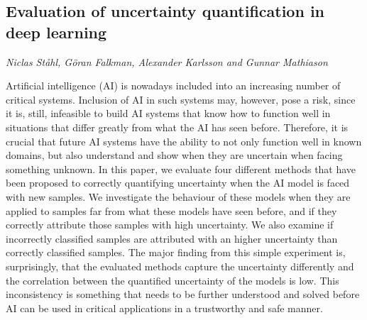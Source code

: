 \documentclass[../booklet.tex]{subfiles}
\begin{document}
\subsection[Evaluation of uncertainty quantification in deep learning. {\it Niclas Ståhl, Göran Falkman, Alexander Karlsson and Gunnar Mathiason}]{Evaluation of uncertainty quantification in deep learning}
   

\begin{center}
  {\it Niclas Ståhl, Göran Falkman, Alexander Karlsson and Gunnar Mathiason}
\end{center}



  Artificial intelligence (AI) is nowadays included into an increasing number of critical systems.
  Inclusion of AI in such systems may, however, pose a risk, since it is, still, infeasible to build AI systems that know how to function well in situations that differ greatly from what the AI has seen before.
  Therefore, it is crucial that future AI systems have the ability to not only function well in known domains, but also understand and show when they are uncertain when facing something unknown.
  In this paper, we evaluate four different methods that have been proposed to correctly quantifying uncertainty when the AI model is faced with new samples.
  We investigate the behaviour of these models when they are applied to samples far from what these models have seen before, and if they correctly attribute those samples with high uncertainty.
  We also examine if incorrectly classified samples are attributed with an higher uncertainty than correctly classified samples.
  The major finding from this simple experiment is, surprisingly, that the evaluated methods capture the uncertainty differently and the correlation between the quantified uncertainty of the models is low.
  This inconsistency is something that needs to be further understood and solved before AI can be used in critical applications in a trustworthy and safe manner.

\end{document}
